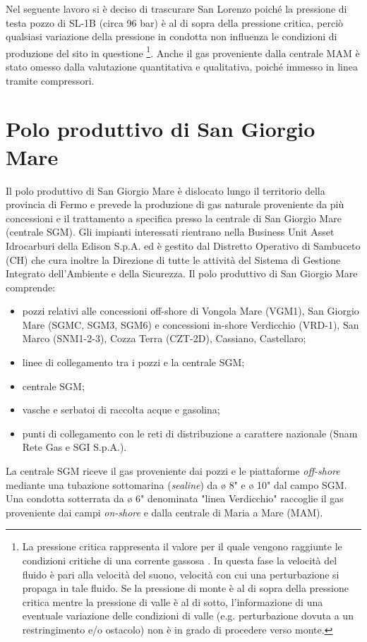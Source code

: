 Nel seguente lavoro si è deciso di trascurare San Lorenzo poiché la pressione di testa pozzo di SL-1B (circa 96 bar) è al di sopra della pressione critica, perciò qualsiasi variazione della pressione in condotta non influenza le condizioni di produzione del sito in questione
\footnote{La pressione critica rappresenta il valore per il quale vengono raggiunte le condizioni critiche di una corrente gassosa \parencite{sabetta2009gasdinamica}. In questa fase la velocità del fluido è pari alla velocità del suono, velocità con cui una perturbazione si propaga in tale fluido. Se la pressione di monte è al di sopra della pressione critica mentre la pressione di valle è al di sotto, l'informazione di una eventuale variazione delle condizioni di valle (e.g. perturbazione dovuta a un restringimento e/o ostacolo) non è in grado di procedere verso monte.}. Anche il gas proveniente dalla centrale MAM è stato omesso dalla valutazione quantitativa e qualitativa, poiché immesso in linea tramite compressori.

\section{Polo produttivo di San Giorgio Mare}
Il polo produttivo di San Giorgio Mare è dislocato lungo il territorio della provincia di Fermo e prevede la produzione di gas naturale proveniente da più concessioni e il trattamento a specifica presso la centrale di San Giorgio Mare (centrale SGM). Gli impianti interessati rientrano nella Business Unit Asset Idrocarburi della Edison S.p.A. ed è gestito dal Distretto Operativo di Sambuceto (CH) che cura inoltre la Direzione di tutte le attività del Sistema di Gestione Integrato dell'Ambiente e della Sicurezza. Il polo produttivo di San Giorgio Mare comprende:
\begin{itemize}
	\item pozzi relativi alle concessioni off-shore di Vongola Mare (VGM1), San Giorgio Mare (SGMC, SGM3, SGM6) e concessioni in-shore Verdicchio (VRD-1), San Marco (SNM1-2-3), Cozza Terra (CZT-2D), Cassiano, Castellaro;
	\item linee di collegamento tra i pozzi e la centrale SGM;
	\item centrale SGM;
	\item vasche e serbatoi di raccolta acque e gasolina;
	\item punti di collegamento con le reti di distribuzione a carattere nazionale (Snam Rete Gas e SGI S.p.A.).
\end{itemize}
La centrale SGM riceve il gas proveniente dai pozzi e le piattaforme \textit{off-shore} mediante una tubazione sottomarina (\textit{sealine}) da ø 8" e ø 10" dal campo SGM. %
Una condotta sotterrata da ø 6" denominata "linea Verdicchio" raccoglie il gas proveniente dai campi \textit{on-shore} e dalla centrale di Maria a Mare (MAM).

